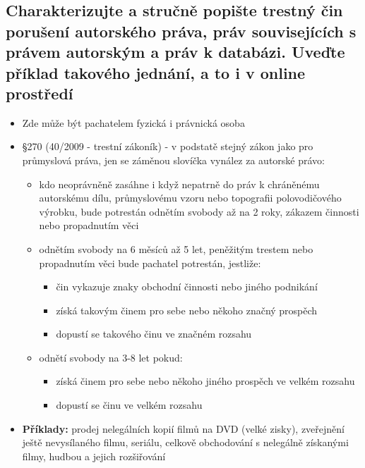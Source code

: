 \subsection{Charakterizujte a stručně popište trestný čin porušení autorského práva, práv souvisejících s právem autorským a práv k databázi. Uveďte příklad takového jednání, a to i v online prostředí}
\begin{itemize}
    \item Zde může být pachatelem fyzická i právnická osoba
    \item §270 (40/2009 - trestní zákoník) - v podstatě stejný zákon jako pro
    průmyslová práva, jen se záměnou slovíčka vynález za autorské právo:
    \begin{itemize}
        \item kdo neoprávněně zasáhne i když nepatrně do práv k chráněnému
        autorskému dílu, průmyslovému vzoru nebo topografii polovodičového
        výrobku, bude potrestán odnětím svobody až na 2 roky, zákazem činnosti
        nebo propadnutím věci
        \item odnětím svobody na 6 měsíců až 5 let, peněžitým trestem nebo
        propadnutím věci bude pachatel potrestán, jestliže:
        \begin{itemize}
            \item čin vykazuje znaky obchodní činnosti nebo jiného podnikání
            \item získá takovým činem pro sebe nebo někoho značný prospěch
            \item dopustí se takového činu ve značném rozsahu
        \end{itemize}
        \item odnětí svobody na 3-8 let pokud:
        \begin{itemize}
            \item získá činem pro sebe nebo někoho jiného prospěch ve velkém
            rozsahu
            \item dopustí se činu ve velkém rozsahu
        \end{itemize}
    \end{itemize}
    \item \textbf{Příklady:} prodej nelegálních kopií filmů na DVD (velké zisky), zveřejnění ještě
    nevysílaného filmu, seriálu, celkově obchodování s nelegálně získanými
    filmy, hudbou a jejich rozšiřování
\end{itemize}
